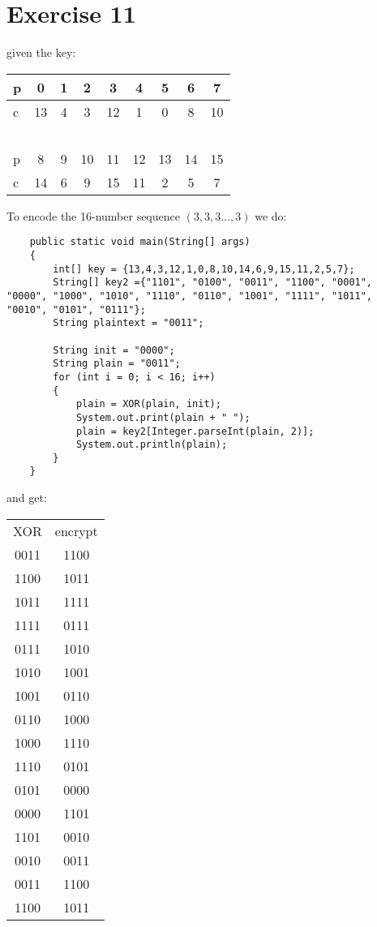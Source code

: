 \section{Exercise 11}
given the key:
\begin{center}
	\begin{tabular}{ l|cccccccc}
	  p & 0 & 1 & 2 & 3 & 4 & 5 & 6 & 7\\ \hline
	  c & 13 & 4 & 3 & 12 & 1 & 0 & 8 & 10\\
	    ~\\
	  p & 8 & 9 & 10 & 11 & 12 & 13 & 14 & 15\\ \hline
	  c & 14 & 6 & 9 & 15 & 11 & 2 & 5 & 7\\
	\end{tabular}
\end{center}
To encode the 16-number sequence $(3,3,3\dots,3)$ we do:
\begin{lstlisting}
    public static void main(String[] args)
	{
		int[] key = {13,4,3,12,1,0,8,10,14,6,9,15,11,2,5,7};
		String[] key2 ={"1101", "0100", "0011", "1100", "0001", "0000", "1000", "1010", "1110", "0110", "1001", "1111", "1011", "0010", "0101", "0111"};
		String plaintext = "0011";
		
		String init = "0000";
		String plain = "0011";
		for (int i = 0; i < 16; i++)
		{
			plain = XOR(plain, init);
			System.out.print(plain + " ");
			plain = key2[Integer.parseInt(plain, 2)];
			System.out.println(plain);
		}
	}
\end{lstlisting}
and get:\\
\begin{tabular}{cc}
XOR & encrypt\\
0011 &1100\\
1100 &1011\\
1011 &1111\\
1111 &0111\\
0111 &1010\\
1010 &1001\\
1001 &0110\\
0110 &1000\\
1000 &1110\\
1110 &0101\\
0101 &0000\\
0000 &1101\\
1101 &0010\\
0010 &0011\\
0011& 1100\\
1100 &1011
\end{tabular}
